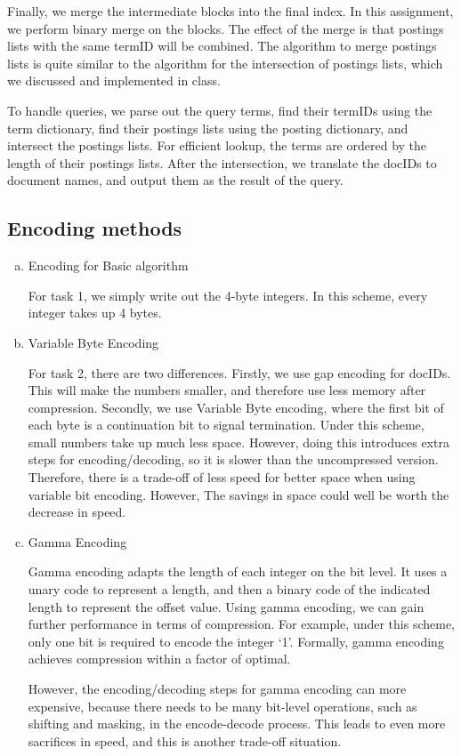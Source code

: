 \documentclass[10pt]{article}
\begin{document}
Finally, we merge the intermediate blocks into the final index. In this assignment, we perform binary merge on the blocks. The effect of the merge is that postings lists with the same termID will be combined. The algorithm to merge postings lists is quite similar to the algorithm for the intersection of postings lists, which we discussed and implemented in class.

To handle queries, we parse out the query terms, find their termIDs using the term dictionary, find their postings lists using the posting dictionary, and intersect the postings lists. For efficient lookup, the terms are ordered by the length of their postings lists. After the intersection, we translate the docIDs to document names, and output them as the result of the query.

\subsection{Encoding methods}
\begin{enumerate}[(a)]
\item Encoding for Basic algorithm

For task 1, we simply write out the 4-byte integers. In this scheme, every integer takes up 4 bytes.
\item Variable Byte Encoding

For task 2, there are two differences. Firstly, we use gap encoding for docIDs. This will make the numbers smaller, and therefore use less memory after compression. Secondly, we use Variable Byte encoding, where the first bit of each byte is a continuation bit to signal termination. Under this scheme, small numbers take up much less space. However, doing this introduces extra steps for encoding/decoding, so it is slower than the uncompressed version. Therefore, there is a trade-off of less speed for better space when using variable bit encoding. However, The savings in space could well be worth the decrease in speed.
\item Gamma Encoding

Gamma encoding adapts the length of each integer on the bit level. It uses a unary code to represent a length, and then a binary code of the indicated length to represent the offset value. Using gamma encoding, we can gain further performance in terms of compression. For example, under this scheme, only one bit is required to encode the integer `1'. Formally, gamma encoding achieves compression within a factor of optimal.

However, the encoding/decoding steps for gamma encoding can more expensive, because there needs to be many bit-level operations, such as shifting and masking, in the encode-decode process. This leads to even more sacrifices in speed, and this is another trade-off situation.
\end{enumerate}
\end{document}
